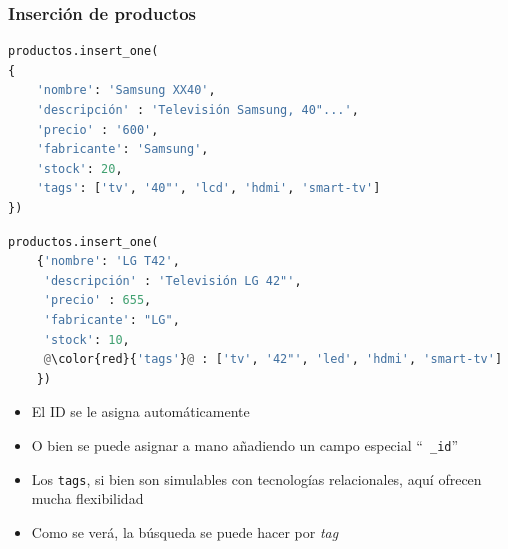 \documentclass[14pt]{beamer}
\begin{document}
\begin{frame}
  \frametitle{Inserción de productos}
\begin{lstlisting}[language=python,basicstyle=\tt]
productos.insert_one(
{
    'nombre': 'Samsung XX40',
    'descripción' : 'Televisión Samsung, 40"...',
    'precio' : '600',
    'fabricante': 'Samsung',
    'stock': 20,
    'tags': ['tv', '40"', 'lcd', 'hdmi', 'smart-tv']
})
\end{lstlisting}

\framebreak

\begin{lstlisting}[language=python,basicstyle=\tt,escapechar=@]
productos.insert_one(
    {'nombre': 'LG T42',
     'descripción' : 'Televisión LG 42"',
     'precio' : 655,
     'fabricante': "LG",
     'stock': 10,
     @\color{red}{'tags'}@ : ['tv', '42"', 'led', 'hdmi', 'smart-tv']
    })
\end{lstlisting}

\framebreak

\begin{itemize}
\item El ID se le asigna automáticamente
\item O bien se puede asignar a mano añadiendo un campo especial ``{\tt
    \_id}''
\item Los {\tt tags}, si bien son simulables con tecnologías relacionales,
  aquí ofrecen mucha flexibilidad
\item Como se verá, la búsqueda se puede hacer por {\em tag\/}
\end{itemize}
\end{frame}
\end{document}
